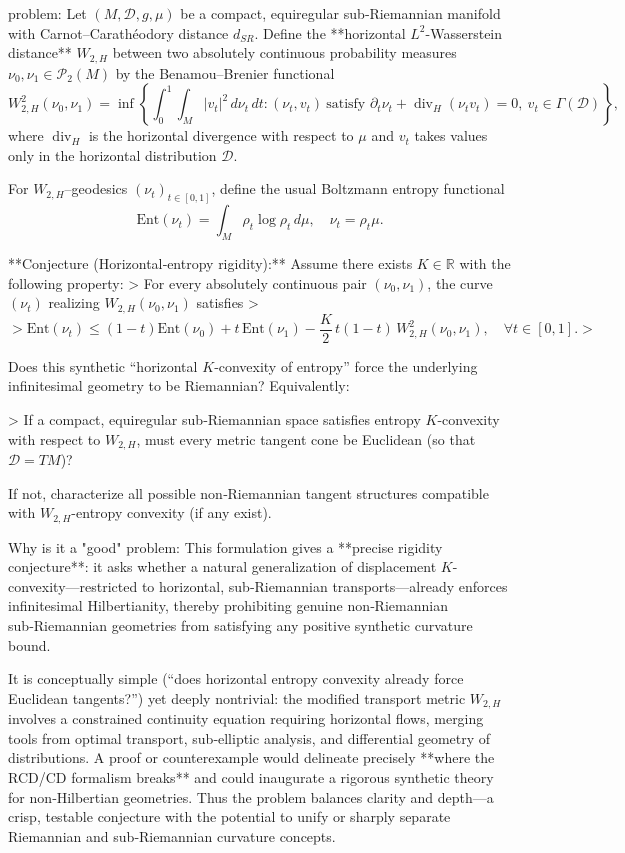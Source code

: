problem:  
Let \((M,\mathcal{D},g,\mu)\) be a compact, equiregular sub‑Riemannian manifold with Carnot–Carathéodory distance \(d_{SR}\).  
Define the **horizontal \(L^2\)-Wasserstein distance** \(W_{2,H}\) between two absolutely continuous probability measures \(\nu_0,\nu_1\in \mathcal{P}_2(M)\) by the Benamou–Brenier functional
\[
W_{2,H}^2(\nu_0,\nu_1)=\inf\!\left\{ \int_0^1\!\!\int_M |v_t|^2\,d\nu_t\,dt :
  (\nu_t,v_t)\ \text{satisfy }\partial_t\nu_t+\operatorname{div}_H(\nu_t v_t)=0,\ v_t\in\Gamma(\mathcal{D}) \right\},
\]
where \(\operatorname{div}_H\) is the horizontal divergence with respect to \(\mu\) and \(v_t\) takes values only in the horizontal distribution \(\mathcal{D}\).

For \(W_{2,H}\)–geodesics \((\nu_t)_{t\in[0,1]}\), define the usual Boltzmann entropy functional
\[
\mathrm{Ent}(\nu_t) = \int_M \rho_t \log\rho_t\, d\mu, \quad \nu_t = \rho_t \mu.
\]

**Conjecture (Horizontal‑entropy rigidity):**  
Assume there exists \(K\in\mathbb{R}\) with the following property:
> For every absolutely continuous pair \((\nu_0,\nu_1)\), the curve \((\nu_t)\) realizing \(W_{2,H}(\nu_0,\nu_1)\) satisfies  
> \[
> \mathrm{Ent}(\nu_t)\le (1-t)\mathrm{Ent}(\nu_0)+t\,\mathrm{Ent}(\nu_1)-\frac{K}{2}\,t(1-t)\,W_{2,H}^2(\nu_0,\nu_1),\quad \forall t\in[0,1].
> \]

Does this synthetic “horizontal \(K\)‑convexity of entropy” force the underlying infinitesimal geometry to be Riemannian?  
Equivalently:  

> If a compact, equiregular sub‑Riemannian space satisfies entropy \(K\)-convexity with respect to \(W_{2,H}\), must every metric tangent cone be Euclidean (so that \(\mathcal{D}=TM\))?

If not, characterize all possible non‑Riemannian tangent structures compatible with \(W_{2,H}\)-entropy convexity (if any exist).  

Why is it a "good" problem:  
This formulation gives a **precise rigidity conjecture**: it asks whether a natural generalization of displacement \(K\)-convexity—restricted to horizontal, sub‑Riemannian transports—already enforces infinitesimal Hilbertianity, thereby prohibiting genuine non‑Riemannian sub‑Riemannian geometries from satisfying any positive synthetic curvature bound.  

It is conceptually simple (“does horizontal entropy convexity already force Euclidean tangents?”) yet deeply nontrivial: the modified transport metric \(W_{2,H}\) involves a constrained continuity equation requiring horizontal flows, merging tools from optimal transport, sub‑elliptic analysis, and differential geometry of distributions.  
A proof or counterexample would delineate precisely **where the RCD/CD formalism breaks** and could inaugurate a rigorous synthetic theory for non‑Hilbertian geometries.  
Thus the problem balances clarity and depth—a crisp, testable conjecture with the potential to unify or sharply separate Riemannian and sub‑Riemannian curvature concepts.